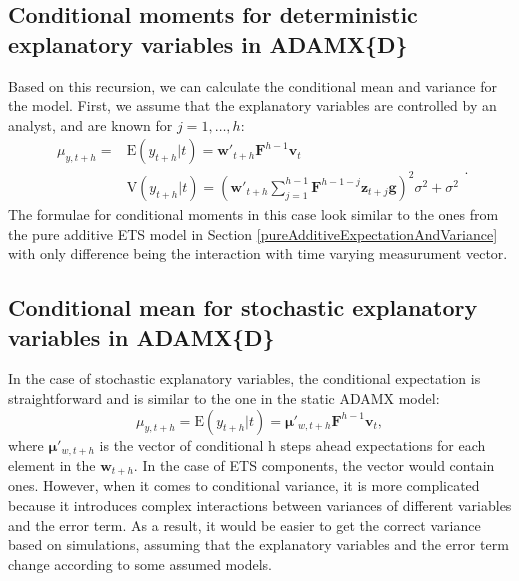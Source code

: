 \documentclass[
]{book}
\theoremstyle{definition}
\theoremstyle{definition}
\theoremstyle{definition}
\theoremstyle{definition}
\theoremstyle{remark}
\begin{document}
\hypertarget{conditional-moments-for-deterministic-explanatory-variables-in-adamxd}{%
\subsection{Conditional moments for deterministic explanatory variables in ADAMX\{D\}}\label{conditional-moments-for-deterministic-explanatory-variables-in-adamxd}}

Based on this recursion, we can calculate the conditional mean and variance for the model. First, we assume that the explanatory variables are controlled by an analyst, and are known for \(j=1, \dots, h\):
\begin{equation}
  \begin{aligned}
    \mu_{y,t+h} = & \text{E}(y_{t+h}|t) = \mathbf{w}'_{t+h} \mathbf{F}^{h-1} \mathbf{v}_{t} \\
    & \text{V}(y_{t+h}|t) = \left(\mathbf{w}'_{t+h} \sum_{j=1}^{h-1} \mathbf{F}^{h-1-j} \mathbf{z}_{t+j} \mathbf{g} \right)^2 \sigma^2 + \sigma^2
  \end{aligned} .
  \label{eq:ADAMETSXPureAdditiveDynamicNonSeasonalMomentsNonRandom}
\end{equation}
The formulae for conditional moments in this case look similar to the ones from the pure additive ETS model in Section \ref{pureAdditiveExpectationAndVariance} with only difference being the interaction with time varying measurument vector.

\hypertarget{conditional-mean-for-stochastic-explanatory-variables-in-adamxd}{%
\subsection{Conditional mean for stochastic explanatory variables in ADAMX\{D\}}\label{conditional-mean-for-stochastic-explanatory-variables-in-adamxd}}

In the case of stochastic explanatory variables, the conditional expectation is straightforward and is similar to the one in the static ADAMX model:
\begin{equation}
    \mu_{y,t+h} = \text{E}(y_{t+h}|t) = \boldsymbol{\mu}'_{w,t+h} \mathbf{F}^{h-1} \mathbf{v}_{t} ,
  \label{eq:ADAMETSXPureAdditiveDynamicNonSeasonalMomentsRandom}
\end{equation}
where \(\boldsymbol{\mu}'_{w,t+h}\) is the vector of conditional h steps ahead expectations for each element in the \(\mathbf{w}_{t+h}\). In the case of ETS components, the vector would contain ones. However, when it comes to conditional variance, it is more complicated because it introduces complex interactions between variances of different variables and the error term. As a result, it would be easier to get the correct variance based on simulations, assuming that the explanatory variables and the error term change according to some assumed models.
\end{document}
